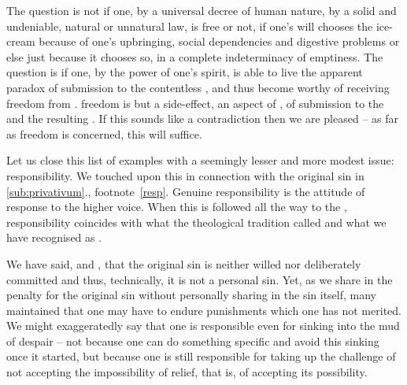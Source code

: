 The question is not if one, by a universal decree of human nature, by a solid
and undeniable, natural or unnatural law, is free or not, if one's will chooses
the ice-cream because of one's upbringing, social dependencies and digestive
problems or else just because it chooses so, in a complete indeterminacy of
emptiness.  The question is if one, by the power of one's {spirit}, is able to
live the apparent paradox of submission to the contentless , and
thus become worthy of receiving freedom from .  freedom is
but a side-effect, an aspect of , of submission to the  and
the resulting .  If this sounds like a contradiction then we
are pleased -- as far as freedom is concerned, this will suffice.

Let us close this list of examples with a seemingly lesser and more modest
issue: responsibility. 
We touched upon this in connection with the original sin in
\ref{sub:privativum}., footnote~{\small{\ref{resp}}}. 
Genuine responsibility is the  attitude of response to the higher
voice. When this  is followed all the way to the ,
responsibility coincides with what the theological tradition called
 and what we have recognised as .

\pa\label{pa:respInv} \inv 
We have said,  and , that the
original sin is neither willed nor deliberately committed and thus,
technically, it is not a personal sin. Yet, as we share in the
penalty for the original sin without personally sharing in the sin 
itself, many maintained that one 
may have to endure punishments which one has not merited.
We might exaggeratedly say that one is responsible even for sinking into the mud
of despair -- not because one can do something specific and avoid this sinking
once it started, but because one is still responsible for
taking up the challenge of not accepting the  impossibility of
relief, that is, of accepting its  possibility.

